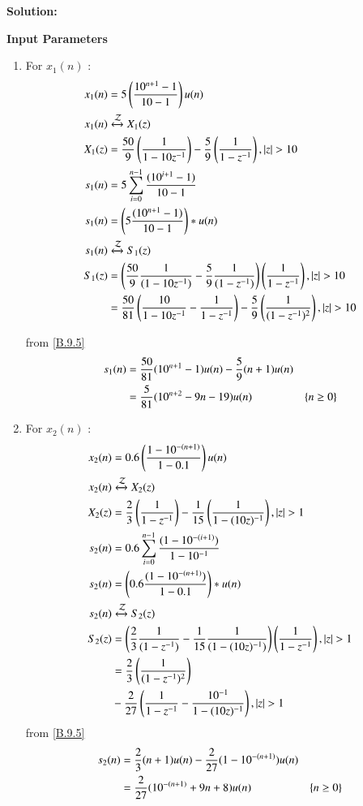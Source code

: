\documentclass[journal,12pt,twocolumn]{IEEEtran}
\theoremstyle{remark}
\begin{document}
\textbf{Solution:}
\begin{table}[h!]
    \centering
    
    \caption{\textbf{Input Parameters}}
    \label{tab:table_sr5}
\end{table} 
\begin{enumerate}
\item For $x_1(n)$ :
\begin{align}
x_1(n) &= 5\left(\frac{10^{n+1}-1}{10-1}\right)u(n)\\
x_1(n) & \xleftrightarrow{\mathcal{Z}} X_1(z)\\
X_1(z) &= \frac{50}{9}\left(\frac{1}{1-10z^{-1}}\right)-\frac{5}{9}\left(\frac{1}{1-z^{-1}}\right), \lvert z \rvert > 10\\
s_1(n) &= 5  \sum_{i=0}^{n-1} \frac{(10^{i+1} -1)}{10-1}\\
s_1(n) &= \left(5\frac{(10^{n+1}-1)}{10-1}\right)*u(n)\\
s_1(n) & \xleftrightarrow{\mathcal{Z}} S_1(z)\\
S_1(z) &= \left(\frac{50}{9}\frac{1}{(1-10z^{-1})}-\frac{5}{9}\frac{1}{(1-z^{-1})}\right)\left(\frac{1}{1-z^{-1}}\right) ,\lvert z \rvert > 10\\
       &=\frac{50}{81}\left(\frac{10}{1-10z^{-1}}-\frac{1}{1-z^{-1}}\right)-\frac{5}{9}\left(\frac{1}{(1-z^{-1})^2}\right) ,\lvert z \rvert > 10
\end{align}

from \eqref{B.9.5}
\begin{align}
s_1(n) &=\frac{50}{81}(10^{n+1}-1)u(n)-\frac{5}{9}(n+1)u(n)\\
       &=\frac{5}{81}(10^{n+2}-9n-19)u(n)  & \left\{n\geq0\right\}
\end{align}
\item For $x_2(n)$ :
\begin{align}
x_2(n) &= 0.6 \left(\frac{1-10^{-(n+1)}}{1-0.1}\right)u(n)\\
x_2(n) & \xleftrightarrow{\mathcal{Z}} X_2(z)\\
X_2(z) &= \frac{2}{3}\left(\frac{1}{1-z^{-1}}\right)-\frac{1}{15}\left(\frac{1}{1-(10z)^{-1}}\right) ,\lvert z \rvert > 1 \\
s_2(n) &= 0.6 \sum_{i=0}^{n-1} \frac{(1-10^{-(i+1)})}{1-10^{-1}}\\
s_2(n) &= \left(0.6 \frac{(1-10^{-(n+1)})}{1-0.1}\right)*u(n)\\
s_2(n) & \xleftrightarrow{\mathcal{Z}} S_2(z)\\
S_2(z) &= \left(\frac{2}{3}\frac{1}{(1-z^{-1})}-\frac{1}{15}\frac{1}{(1-(10z)^{-1})}\right)\left(\frac{1}{1-z^{-1}}\right), \lvert z \rvert > 1\\
   &=\frac{2}{3}\left(\frac{1}{(1-z^{-1})^2}\right)\notag\\
   &-\frac{2}{27}\left(\frac{1}{1-z^{-1}}-\frac{10^{-1}}{1-(10z)^{-1}}\right),\lvert z \rvert > 1
 \end{align}
   from \eqref{B.9.5}
\begin{align}
s_2(n) &=\frac{2}{3}(n+1)u(n)-\frac{2}{27}(1-10^{-(n+1)})u(n)\\
       &= \frac{2}{27}(10^{-(n+1)}+9n+8)u(n)  & \left\{n\geq0\right\}
\end{align}
\end{enumerate}
\end{document}
